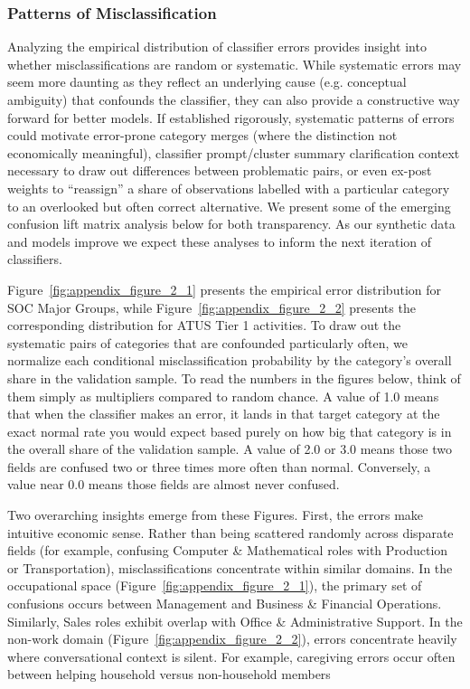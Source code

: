 \documentclass[11pt,a4paper]{article}
\begin{document}
\subsubsection{Patterns of Misclassification}
Analyzing the empirical distribution of classifier errors provides insight into whether misclassifications are random or systematic. While systematic errors may seem more daunting as they reflect an underlying cause (e.g. conceptual ambiguity) that confounds the classifier, they can also provide a constructive way forward for better models. If established rigorously, systematic patterns of errors could motivate error-prone category merges (where the distinction not economically meaningful), classifier prompt/cluster summary clarification context necessary to draw out differences between problematic pairs, or even ex-post weights to ``reassign'' a share of observations labelled with a particular category to an overlooked but often correct alternative. We present some of the emerging confusion lift matrix analysis below for both transparency. As our synthetic data and models improve we expect these analyses to inform the next iteration of classifiers.

Figure~\ref{fig:appendix_figure_2_1} presents the empirical error distribution for SOC Major Groups, while Figure~\ref{fig:appendix_figure_2_2} presents the corresponding distribution for ATUS Tier 1 activities. To draw out the systematic pairs of categories that are confounded particularly often, we normalize each conditional misclassification probability by the category's overall share in the validation sample. To read the numbers in the figures below, think of them simply as multipliers compared to random chance. A value of 1.0 means that when the classifier makes an error, it lands in that target category at the exact normal rate you would expect based purely on how big that category is in the overall share of the validation sample. A value of 2.0 or 3.0 means those two fields are confused two or three times more often than normal. Conversely, a value near 0.0 means those fields are almost never confused. 

Two overarching insights emerge from these Figures. First, the errors make intuitive economic sense. Rather than being scattered randomly across disparate fields (for example, confusing Computer \& Mathematical roles with Production or Transportation), misclassifications concentrate within similar domains. In the occupational space (Figure~\ref{fig:appendix_figure_2_1}), the primary set of confusions occurs between Management and Business \& Financial Operations. Similarly, Sales roles exhibit overlap with Office \& Administrative Support. In the non-work domain (Figure~\ref{fig:appendix_figure_2_2}), errors concentrate heavily where conversational context is silent. For example, caregiving errors occur often between helping household versus non-household members 
\end{document}
